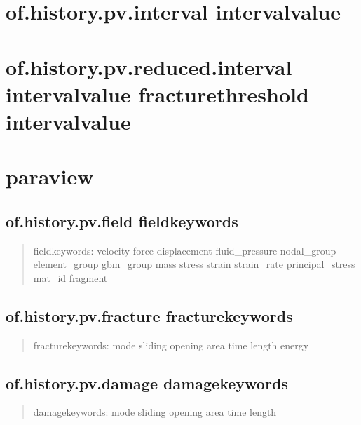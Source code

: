 \documentclass[letterpaper,10pt,english]{sphinxmanual}
\begin{document}
\section{of.history.pv.interval intervalvalue}
\label{\detokenize{rst_tutorials/command_line_guide:of-history-pv-interval-intervalvalue}}

\section{of.history.pv.reduced.interval intervalvalue fracturethreshold intervalvalue}
\label{\detokenize{rst_tutorials/command_line_guide:of-history-pv-reduced-interval-intervalvalue-fracturethreshold-intervalvalue}}

\section{paraview}
\label{\detokenize{rst_tutorials/command_line_guide:paraview}}

\subsection{of.history.pv.field fieldkeywords}
\label{\detokenize{rst_tutorials/command_line_guide:of-history-pv-field-fieldkeywords}}\begin{quote}

fieldkeywords: velocity force displacement fluid\_pressure nodal\_group
element\_group gbm\_group mass stress strain strain\_rate
principal\_stress mat\_id fragment
\end{quote}


\subsection{of.history.pv.fracture fracturekeywords}
\label{\detokenize{rst_tutorials/command_line_guide:of-history-pv-fracture-fracturekeywords}}\begin{quote}

fracturekeywords: mode sliding opening area time length energy
\end{quote}


\subsection{of.history.pv.damage damagekeywords}
\label{\detokenize{rst_tutorials/command_line_guide:of-history-pv-damage-damagekeywords}}\begin{quote}

damagekeywords: mode sliding opening area time length
\end{quote}
\end{document}
